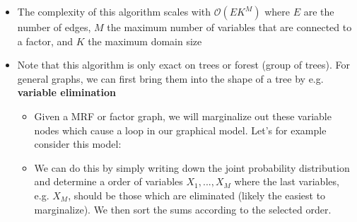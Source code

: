 \begin{itemize}
\begin{equation*}
{\begin{split}
			&\text{If $j$ leaf node:} \hspace{2mm}\mu_{j\to \alpha}(x_j)=1
		\end{split}
		\)}
	\end{equation*}
	The marginalizations/beliefs are in the end:
	\begin{equation*}
	\tcbox[nobeforeafter]{\(
		\begin{split}
		\textbf{Variable belief:} & \hspace{2mm} p(x_i)=\frac{1}{Z}\prod_{\alpha\in\text{ne}(i)}\mu_{\alpha\to i}(x_i)\hspace{5mm}\text{where}\hspace{2mm}Z=\sum_{x_i}\prod_{\alpha\in\text{ne}(i)}\mu_{\alpha\to i}(x_i)\\
		\textbf{Factor belief:} & \hspace{2mm} p(\bm{x}_{\alpha})=\frac{1}{Z}f_{\alpha}(\bm{x}_\alpha) \prod_{i \in\text{ne}(\alpha)}\mu_{i \to\alpha}(x_i)\\
		\end{split}
		\)}
	\end{equation*}
	where a factor belief is the marginalization of all variables except those with an direct edge to the factor.
	\item The complexity of this algorithm scales with $\mathcal{O}(EK^{M})$ where $E$ are the number of edges, $M$ the maximum number of variables that are connected to a factor, and $K$ the maximum domain size
	\item Note that this algorithm is only exact on trees or forest (group of trees). For general graphs, we can first bring them into the shape of a tree by e.g. \textbf{variable elimination}
	\begin{itemize}
		\item Given a MRF or factor graph, we will marginalize out these variable nodes which cause a loop in our graphical model. Let's for example consider this model:
		\begin{figure}[ht!]
			\centering
		\end{figure}
		\item We can do this by simply writing down the joint probability distribution and determine a order of variables $X_1,...,X_M$ where the last variables, e.g. $X_M$, should be those which are eliminated (likely the easiest to marginalize). We then sort the sums according to the selected order.
		

\end{itemize}
\end{itemize}
